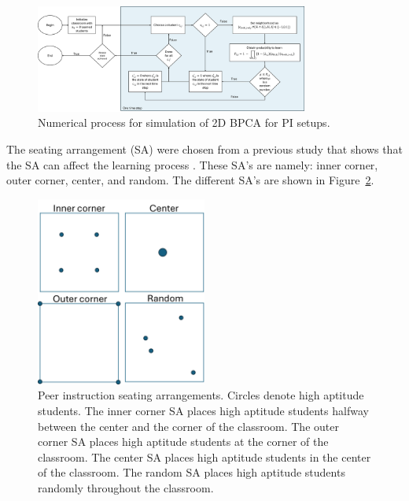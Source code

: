 \begin{figure}[htbp!]
    \centering
    \includegraphics[width=0.8\textwidth]{figures/2DBPCA PI Flowchart.png}
    \caption[Peer instruction simulation flowchart]{Numerical process for simulation of 2D BPCA for PI setups.}
    \label{fig:2DBPCA PI Flowchart}
\end{figure}

The seating arrangement (SA) were chosen from a previous study that shows that the SA can affect the learning process \cite{roxas2010seating}. 
These SA's are namely: inner corner, outer corner, center, and random. The different SA's are shown in Figure~\ref{fig:PI SAs}.

\begin{figure}[htbp!]
    \centering
    \includegraphics[width=0.5\textwidth]{figures/PI SAs.png}
    \caption[Peer instruction seating arrangements.]{ Peer instruction seating arrangements. 
    Circles denote high aptitude students. 
    The inner corner SA places high aptitude students halfway between the center and the corner of the classroom. 
    The outer corner SA places high aptitude students at the corner of the classroom. 
    The center SA places high aptitude students in the center of the classroom. 
    The random SA places high aptitude students randomly throughout the classroom.}
    \label{fig:PI SAs}
 \end{figure}

